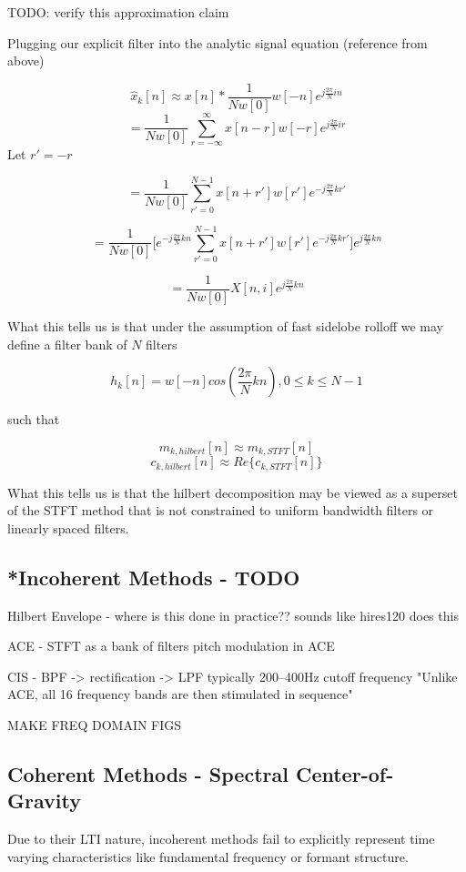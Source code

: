 \documentclass [11pt, proquest] {uwthesis}[2015/03/03]
\begin{document}
TODO: verify this approximation claim

Plugging our explicit filter into the analytic signal equation (reference from above)

$$\widehat{x}_k[n] \approx x[n] * \frac{1}{Nw[0]}w[-n]e^{j\frac{2\pi}{N}in}$$
$$ =\frac{1}{Nw[0]}\sum\limits_{r=-\infty}^{\infty}x[n - r] w[-r] e^{j\frac{2\pi}{N}ir}$$
Let $r' = -r$

$$= \frac{1}{Nw[0]}\sum\limits_{r'=0}^{N-1} x[n + r'] w[r'] e^{-j\frac{2\pi}{N}kr'}$$


$$= \frac{1}{Nw[0]}\bigg[e^{-j\frac{2\pi}{N}kn} \sum\limits_{r'=0}^{N-1} x[n + r'] w[r'] e^{-j\frac{2\pi}{N}kr'}\bigg]e^{j\frac{2\pi}{N}kn}$$

$$ = \frac{1}{Nw[0]}X[n,i]e^{j\frac{2\pi}{N}kn}$$



What this tells us is that under the assumption of fast sidelobe rolloff we may define a filter bank of $N$ filters

$$h_k[n] = w[-n]cos(\frac{2\pi}{N}kn), 0 \leq k \leq N-1$$

such that

$$m_{k,hilbert}[n] \approx m_{k,STFT}[n]$$
$$c_{k,hilbert}[n] \approx Re\{c_{k,STFT}[n]\}$$

What this tells us is that the hilbert decomposition may be viewed as a superset of the STFT method that is not constrained to uniform bandwidth filters or linearly spaced filters.

\subsection{*Incoherent Methods - TODO}

Hilbert Envelope - where is this done in practice??
	sounds like hires120 does this

ACE - STFT as a bank of filters
pitch modulation in ACE


CIS - BPF -> rectification -> LPF   
	typically 200–400Hz cutoff frequency
	"Unlike ACE, all 16 frequency bands are then stimulated in sequence"


MAKE FREQ DOMAIN FIGS


\subsection{Coherent Methods - Spectral Center-of-Gravity}

Due to their LTI nature, incoherent methods fail to explicitly represent time varying characteristics like fundamental frequency or formant structure. \cite{wilson1993design}
\end{document}
